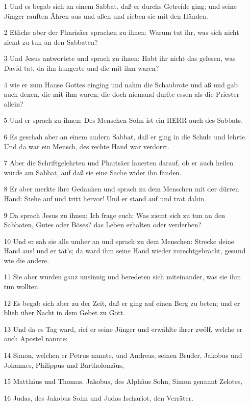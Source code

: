 \par 1 Und es begab sich an einem Sabbat, daß er durchs Getreide ging; und seine Jünger rauften Ähren aus und aßen und rieben sie mit den Händen.
\par 2 Etliche aber der Pharisäer sprachen zu ihnen: Warum tut ihr, was sich nicht ziemt zu tun an den Sabbaten?
\par 3 Und Jesus antwortete und sprach zu ihnen: Habt ihr nicht das gelesen, was David tat, da ihn hungerte und die mit ihm waren?
\par 4 wie er zum Hause Gottes einging und nahm die Schaubrote und aß und gab auch denen, die mit ihm waren; die doch niemand durfte essen als die Priester allein?
\par 5 Und er sprach zu ihnen: Des Menschen Sohn ist ein HERR auch des Sabbats.
\par 6 Es geschah aber an einem andern Sabbat, daß er ging in die Schule und lehrte. Und da war ein Mensch, des rechte Hand war verdorrt.
\par 7 Aber die Schriftgelehrten und Pharisäer lauerten darauf, ob er auch heilen würde am Sabbat, auf daß sie eine Sache wider ihn fänden.
\par 8 Er aber merkte ihre Gedanken und sprach zu dem Menschen mit der dürren Hand: Stehe auf und tritt hervor! Und er stand auf und trat dahin.
\par 9 Da sprach Jesus zu ihnen: Ich frage euch: Was ziemt sich zu tun an den Sabbaten, Gutes oder Böses? das Leben erhalten oder verderben?
\par 10 Und er sah sie alle umher an und sprach zu dem Menschen: Strecke deine Hand aus! und er tat's; da ward ihm seine Hand wieder zurechtgebracht, gesund wie die andere.
\par 11 Sie aber wurden ganz unsinnig und beredeten sich miteinander, was sie ihm tun wollten.
\par 12 Es begab sich aber zu der Zeit, daß er ging auf einen Berg zu beten; und er blieb über Nacht in dem Gebet zu Gott.
\par 13 Und da es Tag ward, rief er seine Jünger und erwählte ihrer zwölf, welche er auch Apostel nannte:
\par 14 Simon, welchen er Petrus nannte, und Andreas, seinen Bruder, Jakobus und Johannes, Philippus und Bartholomäus,
\par 15 Matthäus und Thomas, Jakobus, des Alphäus Sohn, Simon genannt Zelotes,
\par 16 Judas, des Jakobus Sohn und Judas Ischariot, den Verräter.
